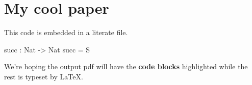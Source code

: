 \documentclass{article}
\begin{document}
\section{My cool paper}

This code is embedded in a literate file.

\begin{code}
\KatlaSpace{}\KatlaNewline{}
\KatlaNewline{}
\KatlaSpace{}\KatlaNewline{}
\KatlaNewline{}
\KatlaNewline{}
\KatlaSpace{}\IdrisKeyword{:}\KatlaSpace{}\KatlaSpace{}\IdrisType{()}\KatlaNewline{}
\KatlaSpace{}\IdrisKeyword{=}\KatlaSpace{}\KatlaSpace{}\KatlaNewline{}
\end{code}

\begin{hidden}
succ : Nat -> Nat
succ = S
\end{hidden}

We're hoping the output pdf will have the \textbf{code blocks} highlighted
while the rest is typeset by \LaTeX{}.
\end{document}
